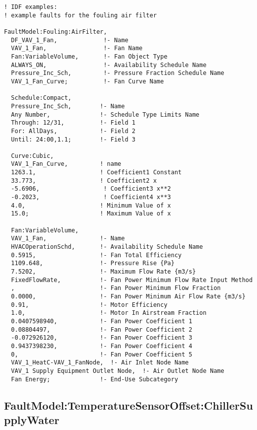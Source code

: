 \begin{lstlisting}
! IDF examples:
! example faults for the fouling air filter

FaultModel:Fouling:AirFilter,
  DF_VAV_1_Fan,             !- Name
  VAV_1_Fan,                !- Fan Name
  Fan:VariableVolume,       !- Fan Object Type
  ALWAYS_ON,                !- Availability Schedule Name
  Pressure_Inc_Sch,         !- Pressure Fraction Schedule Name
  VAV_1_Fan_Curve;          !- Fan Curve Name

  Schedule:Compact,
  Pressure_Inc_Sch,        !- Name
  Any Number,              !- Schedule Type Limits Name
  Through: 12/31,          !- Field 1
  For: AllDays,            !- Field 2
  Until: 24:00,1.1;        !- Field 3

  Curve:Cubic,
  VAV_1_Fan_Curve,         ! name
  1263.1,                  ! Coefficient1 Constant
  33.773,                  ! Coefficient2 x
  -5.6906,                  ! Coefficient3 x**2
  -0.2023,                  ! Coefficient4 x**3
  4.0,                     ! Minimum Value of x
  15.0;                    ! Maximum Value of x

  Fan:VariableVolume,
  VAV_1_Fan,               !- Name
  HVACOperationSchd,       !- Availability Schedule Name
  0.5915,                  !- Fan Total Efficiency
  1109.648,                !- Pressure Rise {Pa}
  7.5202,                  !- Maximum Flow Rate {m3/s}
  FixedFlowRate,           !- Fan Power Minimum Flow Rate Input Method
  ,                        !- Fan Power Minimum Flow Fraction
  0.0000,                  !- Fan Power Minimum Air Flow Rate {m3/s}
  0.91,                    !- Motor Efficiency
  1.0,                     !- Motor In Airstream Fraction
  0.0407598940,            !- Fan Power Coefficient 1
  0.08804497,              !- Fan Power Coefficient 2
  -0.072926120,            !- Fan Power Coefficient 3
  0.9437398230,            !- Fan Power Coefficient 4
  0,                       !- Fan Power Coefficient 5
  VAV_1_HeatC-VAV_1_FanNode,  !- Air Inlet Node Name
  VAV_1 Supply Equipment Outlet Node,  !- Air Outlet Node Name
  Fan Energy;              !- End-Use Subcategory
\end{lstlisting}

\subsection{FaultModel:TemperatureSensorOffset:ChillerSupplyWater}\label{faultmodeltemperaturesensoroffsetchillersupplywater}

